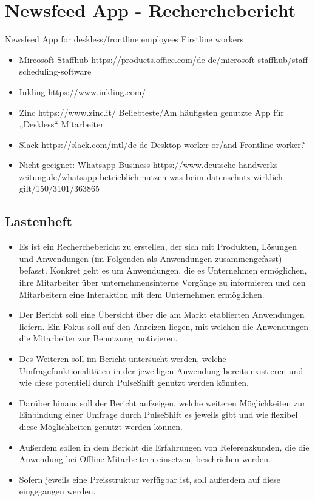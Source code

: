 \section{Newsfeed App - Recherchebericht}
\label{section:realisation:newsfeed_app}


Newsfeed App for deskless/frontline employees Firstline workers
\begin{itemize}
\item {Mircosoft Staffhub https://products.office.com/de-de/microsoft-staffhub/staff-scheduling-software}
\item {Inkling 	https://www.inkling.com/ }
\item {Zinc https://www.zinc.it/ Beliebteste/Am häufigsten genutzte App für „Deskless“ Mitarbeiter}
\item {Slack https://slack.com/intl/de-de Desktop worker or/and Frontline worker?}
\item {Nicht geeignet: Whatsapp Business https://www.deutsche-handwerks-zeitung.de/whatsapp-betrieblich-nutzen-was-beim-datenschutz-wirklich-gilt/150/3101/363865}
\end{itemize}


\subsection{Lastenheft}
\begin{itemize}
\item Es ist ein Recherchebericht zu erstellen, der sich mit Produkten, Lösungen und Anwendungen (im Folgenden als Anwendungen zusammengefasst) befasst. Konkret geht es um Anwendungen, die es Unternehmen ermöglichen, ihre Mitarbeiter über unternehmensinterne Vorgänge zu informieren und den Mitarbeitern eine Interaktion mit dem Unternehmen ermöglichen. 
\item Der Bericht soll eine Übersicht über die am Markt etablierten Anwendungen liefern. Ein Fokus soll auf den Anreizen liegen, mit welchen die Anwendungen die Mitarbeiter zur Benutzung motivieren.
\item Des Weiteren soll im Bericht untersucht werden, welche Umfragefunktionalitäten in der jeweiligen Anwendung bereits existieren und wie diese potentiell durch PulseShift genutzt werden könnten. 
\item Darüber hinaus soll der Bericht aufzeigen, welche weiteren Möglichkeiten zur Einbindung einer Umfrage durch PulseShift es jeweils gibt und wie flexibel diese Möglichkeiten genutzt werden können.
\item Außerdem sollen in dem Bericht die Erfahrungen von Referenzkunden, die die Anwendung bei Offline-Mitarbeitern einsetzen, beschrieben werden. 
\item Sofern jeweils eine Preisstruktur verfügbar ist, soll außerdem auf diese eingegangen werden.
\end{itemize}

